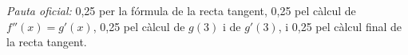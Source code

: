 \begin{apartats}
\begin{solucio}
\textit{Pauta oficial:} 0,25 per la fórmula de la recta tangent, 0,25 pel càlcul de $f''(x)=g'(x)$, 0,25 pel càlcul
de $g(3)$ i de $g'(3)$, i 0,25 pel càlcul final de la recta tangent.
\end{solucio}

\end{apartats}
